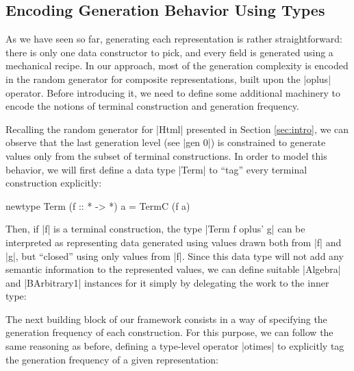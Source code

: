 %
\subsection{Encoding Generation Behavior Using Types}

As we have seen so far, generating each representation is rather
straightforward: there is only one data constructor to pick, and every field is
generated using a mechanical recipe.
%
In our approach, most of the generation complexity is encoded in the random
generator for composite representations, built upon the |oplus| operator.
%
Before introducing it, we need to define some additional machinery to encode the
notions of terminal construction and generation frequency.
%

Recalling the random generator for |Html| presented in Section \ref{sec:intro},
we can observe that the last generation level (see |gen 0|) is constrained to
generate values only from the subset of terminal constructions.
%
In order to model this behavior, we will first define a data type |Term| to
``tag'' every terminal construction explicitly:

\begin{code}
newtype Term (f :: * -> *) a = TermC (f a)
\end{code}
%
Then, if |f| is a terminal construction, the type |Term f oplus' g| can be
interpreted as representing data generated using values drawn both from |f| and
|g|, but ``closed'' using only values from |f|.
%
Since this data type will not add any semantic information to the represented
values, we can define suitable |Algebra| and |BArbitrary1| instances for it
simply by delegating the work to the inner type:



The next building block of our framework consists in a way of specifying the
generation frequency of each construction.
%
For this purpose, we can follow the same reasoning as before, defining a
type-level operator |otimes| to explicitly tag the generation frequency of a
given representation:

